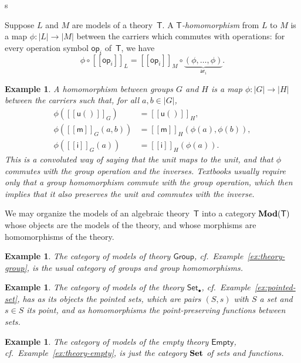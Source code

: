 s\documentclass{amsart}
\newcommand{\theory}[1]{\mathsf{#1}} %
\newcommand{\Mod}[1]{\text{\textbf{Mod}}(\theory{#1})} %
\newcommand{\category}[1]{\text{\textbf{#1}}} %
\newcommand{\carrier}[1]{|#1|} %
\newcommand{\op}[1]{\mathsf{op}_{#1}} %
\newcommand{\arity}[1]{\mathsf{ar}_{#1}} %
\newcommand{\sem}[1]{[\![#1]\!]} %
\newtheorem{example}[definition]{Example}
\begin{document}
Suppose $L$ and $M$ are models of a theory~$\theory{T}$. A
\emph{$\theory{T}$-homomorphism} from $L$ to $M$ is a map $\phi : \carrier{L} \to \carrier{M}$ between the
carriers which commutes with operations: for every operation symbol $\op{i}$
of~$\theory{T}$, we have
%
\begin{equation*}
  \phi \circ \sem{\op{i}}_L = \sem{\op{i}}_M \circ \underbrace{(\phi, \ldots, \phi)}_{\arity{i}}.
\end{equation*}

\begin{example}
  A homomorphism between groups $G$ and $H$ is a map $\phi : \carrier{G} \to \carrier{H}$ between the
  carriers such that, for all $a, b \in \carrier{G}$,
  \begin{align*}
    \phi(\sem{\mathsf{u}()}_G) &= \sem{\mathsf{u}()}_H,\\
    \phi(\sem{\mathsf{m}}_G (a,b)) &= \sem{\mathsf{m}}_H (\phi(a), \phi(b)),\\
    \phi(\sem{\mathsf{i}}_G (a)) &= \sem{\mathsf{i}}_H (\phi(a)).
  \end{align*}
  This is a convoluted way of saying that the unit maps to the unit, and that $\phi$
  commutes with the group operation and the inverses. Textbooks usually require only that
  a group homomorphism commute with the group operation, which then implies that it also
  preserves the unit and commutes with the inverse.
\end{example}

We may organize the models of an algebraic theory~$\theory{T}$ into a category $\Mod{T}$
whose objects are the models of the theory, and whose morphisms are homomorphisms of the
theory.

\begin{example}
  The category of models of theory $\theory{Group}$, cf.\ Example~\ref{ex:theory-group},
  is the usual category of groups and group homomorphisms.
\end{example}

\begin{example}
  The category of models of the theory $\theory{Set_\bullet}$, cf.\
  Example~\ref{ex:pointed-set}, has as its objects the pointed sets, which are pairs
  $(S, s)$ with $S$ a set and $s \in S$ its \emph{point}, and as homomorphisms
  the point-preserving functions between sets.
\end{example}

\begin{example}
  The category of models of the empty theory $\theory{Empty}$, cf.\
  Example~\ref{ex:theory-empty}, is just the category $\category{Set}$ of sets and
  functions.
\end{example}
\end{document}

